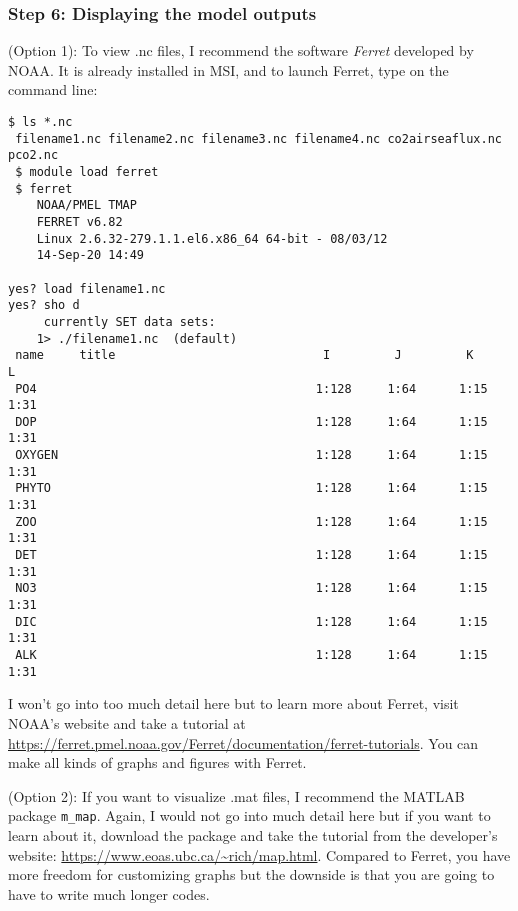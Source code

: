 \documentclass[a4paper]{article}
\def\noin{\noindent }
\begin{document}
\subsubsection{Step 6: Displaying the model outputs}
\noin (Option 1): To view .nc files, I recommend the software \emph{Ferret} developed by NOAA. It is already installed in MSI, and to launch Ferret, type on the command line:
\begin{lstlisting}[style=DOS]
 $ ls *.nc
 filename1.nc filename2.nc filename3.nc filename4.nc co2airseaflux.nc pco2.nc
 $ module load ferret
 $ ferret
 	NOAA/PMEL TMAP
 	FERRET v6.82
 	Linux 2.6.32-279.1.1.el6.x86_64 64-bit - 08/03/12
 	14-Sep-20 14:49

yes? load filename1.nc
yes? sho d
     currently SET data sets:
    1> ./filename1.nc  (default)
 name     title                             I         J         K         L
 PO4                                       1:128     1:64      1:15      1:31
 DOP                                       1:128     1:64      1:15      1:31
 OXYGEN                                    1:128     1:64      1:15      1:31
 PHYTO                                     1:128     1:64      1:15      1:31
 ZOO                                       1:128     1:64      1:15      1:31
 DET                                       1:128     1:64      1:15      1:31
 NO3                                       1:128     1:64      1:15      1:31
 DIC                                       1:128     1:64      1:15      1:31
 ALK                                       1:128     1:64      1:15      1:31
\end{lstlisting}
I won't go into too much detail here but to learn more about Ferret, visit NOAA's website and take a tutorial at \url{https://ferret.pmel.noaa.gov/Ferret/documentation/ferret-tutorials}. You can make all kinds of graphs and figures with Ferret.

\vspace{5mm}
\noin (Option 2): If you want to visualize .mat files, I recommend the MATLAB package \verb|m_map|. Again, I would not go into much detail here but if you want to learn about it, download the package and take the tutorial from the developer's website: \url{https://www.eoas.ubc.ca/~rich/map.html}. Compared to Ferret, you have more freedom for customizing graphs but the downside is that you are going to have to write much longer codes.
\end{document}
